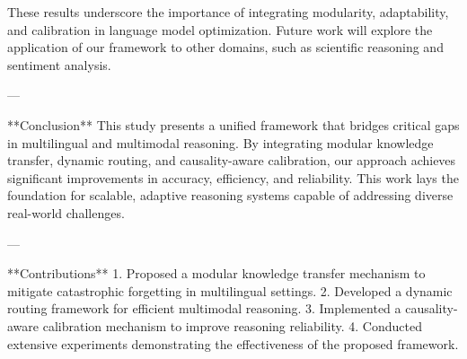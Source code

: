 These results underscore the importance of integrating modularity, adaptability, and calibration in language model optimization. Future work will explore the application of our framework to other domains, such as scientific reasoning and sentiment analysis.  

---

**Conclusion**  
This study presents a unified framework that bridges critical gaps in multilingual and multimodal reasoning. By integrating modular knowledge transfer, dynamic routing, and causality-aware calibration, our approach achieves significant improvements in accuracy, efficiency, and reliability. This work lays the foundation for scalable, adaptive reasoning systems capable of addressing diverse real-world challenges.  

---

**Contributions**  
1. Proposed a modular knowledge transfer mechanism to mitigate catastrophic forgetting in multilingual settings.  
2. Developed a dynamic routing framework for efficient multimodal reasoning.  
3. Implemented a causality-aware calibration mechanism to improve reasoning reliability.  
4. Conducted extensive experiments demonstrating the effectiveness of the proposed framework.  

